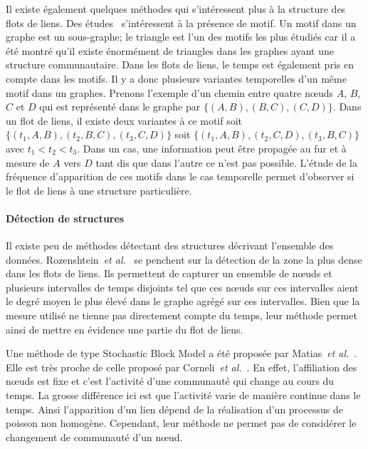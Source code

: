 Il existe également quelques méthodes qui s'intéressent plus à la structure des flots de liens.
Des études~\cite{Kovanen2011a,Kovanen2013} s'intéressent à la présence de motif.
Un motif dans un graphe est un sous-graphe; le triangle est l'un des motifs les plus étudiés car il a été montré qu'il existe énormément de triangles dans les graphes ayant une structure communautaire.
Dans les flots de liens, le temps est également pris en compte dans les motifs.
Il y a donc plusieurs variantes temporelles d'un même motif dans un graphes.
Prenons l'exemple d'un chemin entre quatre n\oe uds $A$, $B$, $C$ et $D$ qui est représenté dans le graphe par  $\{(A,B), (B,C), (C,D)\}$.
Dans un flot de liens, il existe deux variantes à ce motif soit
$\{(t_1,A,B), (t_2,B,C), (t_3,C,D)\}$ soit $\{(t_1,A,B), (t_2,C,D), (t_3,B,C)\}$ avec $t_1<t_2<t_3$.
Dans un cas,  une information peut être propagée au fur et à mesure de $A$ vers $D$ tant dis que dans l'autre ce n'est pas possible.
L'étude de la fréquence d'apparition de ces motifs dans le cas temporelle permet d'observer si le flot de liens à une structure particulière. 



\paragraph{Détection de structures}
Il existe peu de méthodes détectant des structures décrivant l'ensemble des données.
Rozenshtein~\emph{et al.}~\cite{rozenshtein2014} se penchent sur la détection de la zone la plus dense dans les flots de liens.
Ils permettent de capturer un ensemble de n\oe uds et plusieurs intervalles de temps disjoints tel que ces n\oe uds sur ces intervalles aient le degré moyen le plus élevé dans le graphe agrégé sur ces intervalles.
Bien que la mesure utilisé ne tienne pas directement compte du temps, leur méthode permet ainsi de mettre en évidence une partie du flot de liens.

Une méthode de type Stochastic Block Model a été proposée par Matias~\emph{et al.}~\cite{Matias2015a}.
Elle est très proche de celle proposé par Corneli~\emph{et al.}~\cite{Corneli2016}.
En effet, l'affiliation des n\oe uds est fixe et c'est l'activité d'une communauté qui change au cours du temps.
La grosse différence ici est que l'activité varie de manière continue dans le temps.
Ainsi l'apparition d'un lien dépend de la réalisation d'un processus de poisson non homogène.
Cependant, leur méthode ne permet pas de considérer le changement de communauté d'un n\oe ud.

